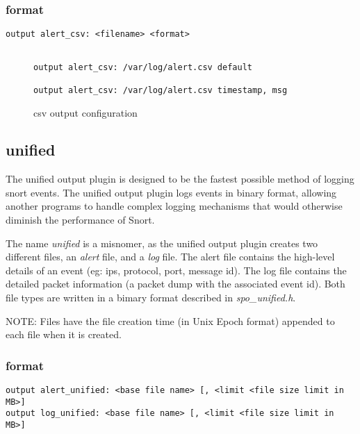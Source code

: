 \documentclass[english]{report}
\begin{document}
\subsubsection{format}

\begin{verbatim}
output alert_csv: <filename> <format>


\end{verbatim}
%
\begin{figure}[!hbpt]
\begin{verbatim}
output alert_csv: /var/log/alert.csv default

output alert_csv: /var/log/alert.csv timestamp, msg
\end{verbatim}

\caption{csv output configuration\label{csv output configuration}}
\end{figure}

\subsection{unified}

The unified output plugin is designed to be the fastest possible method of
logging snort events.  The unified output plugin logs events in binary format,
allowing another programs to handle complex logging mechanisms that would
otherwise diminish the performance of Snort.

The name \emph{unified} is a misnomer, as the unified output plugin creates two
different files, an \emph{alert} file, and a \emph{log} file.   The alert file
contains the high-level details of an event (eg: ips, protocol, port, message
id).  The log file contains the detailed packet information (a packet dump with
the associated event id).  Both file types are written in a bimary format
described in \emph{spo\_unified.h}.

NOTE: Files have the file creation time (in Unix Epoch format) appended to each
file when it is created.

\subsubsection{format}

\begin{verbatim}
output alert_unified: <base file name> [, <limit <file size limit in MB>]
output log_unified: <base file name> [, <limit <file size limit in MB>]
\end{verbatim}
\end{document}
